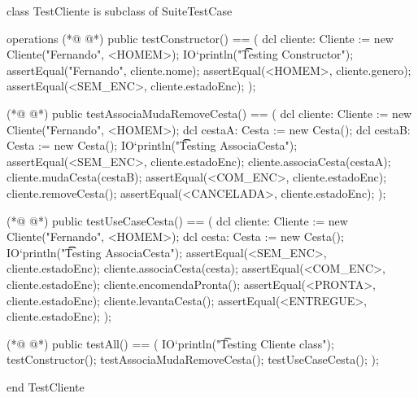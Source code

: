 \begin{vdmpp}[breaklines=true]
class TestCliente is subclass of SuiteTestCase

operations
(*@
\label{testConstructor:4}
@*)
  public testConstructor() == (  
   dcl cliente: Cliente := new Cliente("Fernando", <HOMEM>);
    IO`println("\t\t Testing Constructor");
    assertEqual("Fernando", cliente.nome);
    assertEqual(<HOMEM>, cliente.genero);
    assertEqual(<SEM_ENC>, cliente.estadoEnc);
  );
  
(*@
\label{testAssociaMudaRemoveCesta:12}
@*)
  public testAssociaMudaRemoveCesta() == (
   dcl cliente: Cliente := new Cliente("Fernando", <HOMEM>);
   dcl cestaA: Cesta := new Cesta();
   dcl cestaB: Cesta := new Cesta();
   IO`println("\t\t Testing AssociaCesta");
   assertEqual(<SEM_ENC>, cliente.estadoEnc);
   cliente.associaCesta(cestaA);
   cliente.mudaCesta(cestaB);
   assertEqual(<COM_ENC>, cliente.estadoEnc);
   cliente.removeCesta();
   assertEqual(<CANCELADA>, cliente.estadoEnc);
  );
    
(*@
\label{testUseCaseCesta:25}
@*)
  public testUseCaseCesta() == (
   dcl cliente: Cliente := new Cliente("Fernando", <HOMEM>);
   dcl cesta: Cesta := new Cesta();
   IO`println("\t\t Testing AssociaCesta");
   assertEqual(<SEM_ENC>, cliente.estadoEnc);
   cliente.associaCesta(cesta);
   assertEqual(<COM_ENC>, cliente.estadoEnc);
   cliente.encomendaPronta();
   assertEqual(<PRONTA>, cliente.estadoEnc);
   cliente.levantaCesta();
   assertEqual(<ENTREGUE>, cliente.estadoEnc);
  );

(*@
\label{testAll:38}
@*)
  public testAll() == (
    IO`println("\t Testing Cliente class");
    testConstructor();
    testAssociaMudaRemoveCesta();
    testUseCaseCesta();
  );

end TestCliente
\end{vdmpp}
